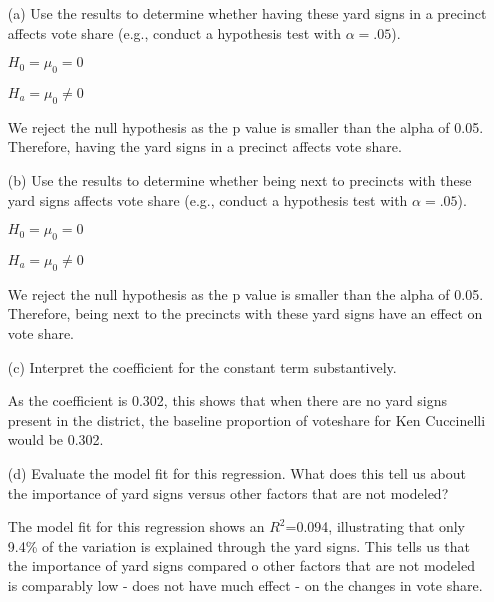 \documentclass[12pt,letterpaper]{article}
\begin{document}
\vspace{.5cm}
\begin{enumerate}
	\item [(a)] Use the results to determine whether having these yard signs in a precinct affects vote share (e.g., conduct a hypothesis test with $\alpha = .05$).
	
	$H_{0}= \mu_{0} = 0$
	
	$H_{a}= \mu_{0} \neq 0$
	
		
		
	We reject the null hypothesis as the p value is smaller than the alpha of 0.05. Therefore, having the yard signs in a precinct affects vote share. 
		
	\item [(b)]  Use the results to determine whether being
	next to precincts with these yard signs affects vote
	share (e.g., conduct a hypothesis test with $\alpha = .05$).
	
	$H_{0}= \mu_{0} = 0$
	
	$H_{a}= \mu_{0} \neq 0$
	
	
We reject the null hypothesis as the p value is smaller than the alpha of 0.05. Therefore, being next to the precincts with these yard signs have an effect on vote share.
	
	\vspace{3cm}
	\item [(c)] Interpret the coefficient for the constant term substantively.
	
	As the coefficient is 0.302, this shows that when there are no yard signs present in the district, the baseline proportion of voteshare for Ken Cuccinelli would be 0.302. 
		\vspace{3cm}

	\item [(d)] Evaluate the model fit for this regression.  What does this	tell us about the importance of yard signs versus other factors that are not modeled?
	
	The model fit for this regression shows an $R^2$=0.094, illustrating that only 9.4\% of the variation is explained through the yard signs. This tells us that the importance of yard signs compared o other factors that are not modeled is comparably low - does not have much effect - on the changes in vote share.   
	
\end{enumerate}  

\newpage
\end{document}
